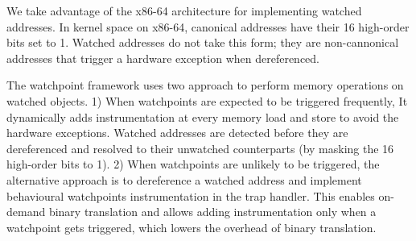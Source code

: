 \documentclass[letterpaper,twocolumn,10pt]{article}
\begin{document}

We take advantage of the x86-64 architecture for implementing watched addresses. In kernel space on x86-64, canonical addresses have their 16 high-order bits set to 1. Watched addresses do not take this form; they are non-cannonical addresses that trigger a hardware exception when dereferenced.

The watchpoint framework uses two approach to perform memory operations on watched objects. 1) When watchpoints are expected to be triggered frequently, It dynamically adds instrumentation at every memory load and store to avoid the hardware exceptions. Watched addresses are detected before they are dereferenced and resolved to their unwatched counterparts (by masking the 16 high-order bits to 1). 2) When watchpoints are unlikely to be triggered, the alternative approach is to dereference a watched address and implement behavioural watchpoints instrumentation in the trap handler. This enables on-demand binary translation and allows adding instrumentation only when a watchpoint gets triggered, which lowers the overhead of binary translation. %










\end{document}
